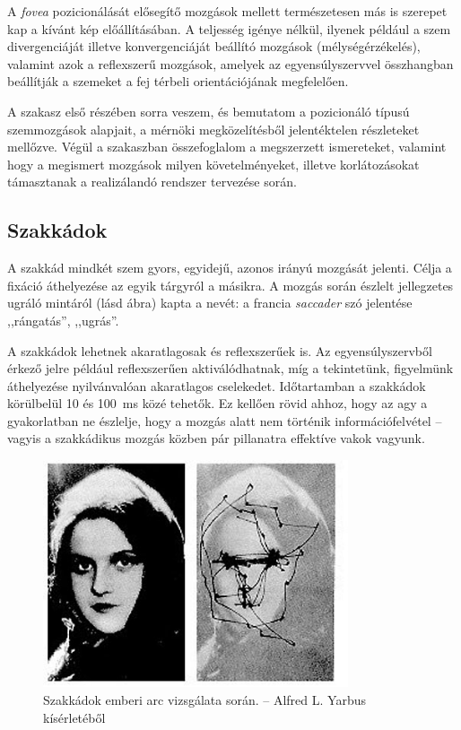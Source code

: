 A \emph{fovea} pozicionálását elősegítő mozgások mellett természetesen más is szerepet kap a kívánt kép előállításában. A teljesség igénye nélkül, ilyenek például a szem divergenciáját illetve konvergenciáját beállító mozgások (mélységérzékelés), valamint azok a reflexszerű mozgások, amelyek az egyensúlyszervvel összhangban beállítják a szemeket a fej térbeli orientációjának megfelelően.

\bigskip

A szakasz első részében sorra veszem, és bemutatom a pozicionáló típusú szemmozgások alapjait, a mérnöki megközelítésből jelentéktelen részleteket mellőzve. Végül a  szakaszban összefoglalom a megszerzett ismereteket, valamint hogy a megismert mozgások milyen követelményeket, illetve korlátozásokat támasztanak a realizálandó rendszer tervezése során.

\subsection{Szakkádok}\label{sect:szakkadok}

A szakkád mindkét szem gyors, egyidejű, azonos irányú mozgását jelenti. Célja a fixáció áthelyezése az egyik tárgyról a másikra. A mozgás során észlelt jellegzetes ugráló mintáról (lásd  ábra) kapta a nevét: a francia \emph{saccader} szó jelentése ,,rángatás'', ,,ugrás''.

A szakkádok lehetnek akaratlagosak és reflexszerűek is. Az egyensúlyszervből érkező jelre például reflexszerűen aktiválódhatnak, míg a tekintetünk, figyelmünk áthelyezése nyilvánvalóan akaratlagos cselekedet. Időtartamban a szakkádok körülbelül 10 és 100~ms közé tehetők. Ez kellően rövid ahhoz, hogy az agy a gyakorlatban ne észlelje, hogy a mozgás alatt nem történik információfelvétel -- vagyis a szakkádikus mozgás közben pár pillanatra effektíve vakok vagyunk. \cite{shebilske}

\begin{figure}[!ht]
\centering
\includegraphics[width=90mm, keepaspectratio]{figures/yarbus_saccadic.jpg}
\caption{Szakkádok emberi arc vizsgálata során. -- Alfred L. Yarbus kísérletéből}
\label{fig:yarbus_saccadic}
\end{figure}

